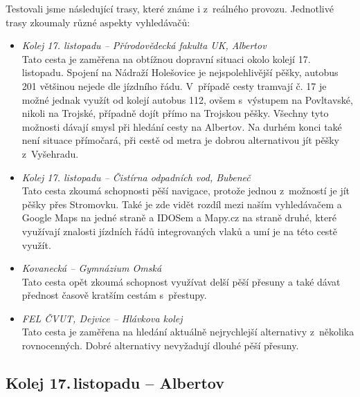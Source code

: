 Testovali jsme následující trasy, které známe i z~reálného provozu. Jednotlivé
trasy zkoumaly různé aspekty vyhledávačů:
\begin{itemize}
	\item {\em Kolej 17. listopadu -- Přírodovědecká fakulta UK, Albertov}\\ Tato
	cesta je zaměřena na obtížnou dopravní situaci okolo kolejí 17.
	listopadu. Spojení na Nádraží Holešovice je nejspolehlivější pěšky,
	autobus 201 většinou nejede dle jízdního řádu. V~případě cesty tramvají
	č. 17 je možné jednak využít od kolejí autobus 112, ovšem s~výstupem na
	Povltavské, nikoli na Trojské, případně dojít přímo na Trojskou pěšky.
	Všechny tyto možnosti dávají smysl při hledání cesty na Albertov. Na
	durhém konci také není situace přímočará, při cestě od metra je dobrou
	alternativou jít pěšky z~Vyšehradu. 
	\item {\em Kolej 17. listopadu -- Čistírna odpadních vod, Bubeneč}\\ Tato
	cesta zkoumá schopnosti pěší navigace, protože jednou z~možností je jít
	pěšky přes Stromovku. Také je zde vidět rozdíl mezi naším vyhledávačem a
	Google Maps na jedné straně a IDOSem a Mapy.cz na straně druhé, které
	využívají znalosti jízdních řádů integrovaných vlaků a umí je na této
	cestě využít.
	\item {\em Kovanecká -- Gymnázium Omská}\\ Tato cesta opět zkoumá schopnost
	využívat delší pěší přesuny a také dávat přednost časově kratším cestám
	s~přestupy. 
	\item {\em FEL ČVUT, Dejvice -- Hlávkova kolej}\\ Tato cesta je zaměřena na
	hledání aktuálně nejrychlejší alternativy z~několika rovnocenných. Dobré
	alternativy nevyžadují dlouhé pěší přesuny.
\end{itemize}
\subsection{Kolej 17.\,listopadu -- Albertov}

